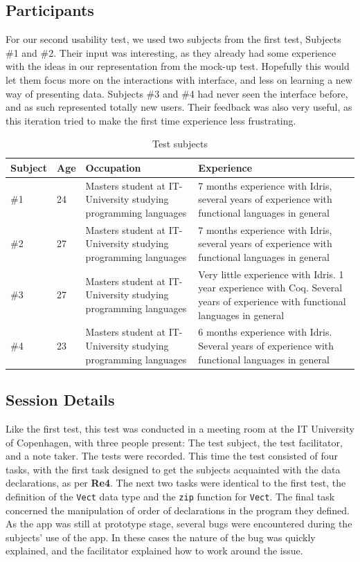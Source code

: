 \subsection{Participants}
For our second usability test, we used two subjects from the first test,
Subjects \#1 and \#2. Their input was interesting, as they already had some
experience with the ideas in our representation from the mock-up test.
Hopefully this would let them focus more on the interactions with interface,
and less on learning a new way of presenting data. Subjects \#3 and \#4 had
never seen the interface before, and as such represented totally new users.
Their feedback was also very useful, as this iteration tried to make the first
time experience less frustrating.

\begin{table}[ht]
\centering
\begin{tabular}{| l | l | p{5cm} | p{5cm} |}
\hline
Subject & Age & Occupation & Experience \\ \hline
\#1 & 24 & Masters student at IT-University studying programming languages & 7 months experience with Idris, several years of experience with functional languages in general \\ \hline
\#2 & 27 & Masters student at IT-University studying programming languages & 7 months experience with Idris, several years of experience with functional languages in general \\ \hline
\#3 & 27 & Masters student at IT-University studying programming languages & Very little experience with Idris. 1 year experience with Coq. Several years of experience with functional languages in general \\ \hline
\#4 & 23 & Masters student at IT-University studying programming languages & 6 months experience with Idris. Several years of experience with functional languages in general \\ \hline
\end{tabular}
\caption{Test subjects}
\label{table:second_test_subjects}
\end{table}

\subsection{Session Details}
Like the first test, this test was conducted in a meeting room at the IT
University of Copenhagen, with three people present: The test subject, the test facilitator,
and a note taker. The tests were recorded. This time the test consisted of four
tasks, with the first task designed to get the subjects acquainted with the
data declarations, as per \textbf{Re4}. The next two tasks were identical to the first test, the
definition of the \texttt{Vect} data type and the \texttt{zip} function for
\texttt{Vect}. The final task concerned the manipulation of order of
declarations in the program they defined. As the app was still at prototype
stage, several bugs were encountered during the subjects' use of the app. In these
cases the nature of the bug was quickly explained, and the facilitator
explained how to work around the issue.

